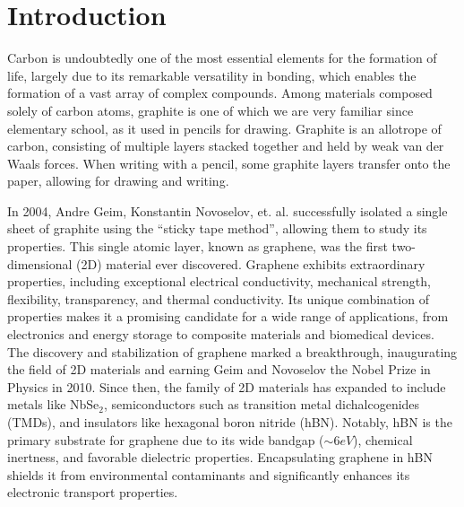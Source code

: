 %
%


\chapter{Introduction} \label{ch:intro}

Carbon is undoubtedly one of the most essential elements for the formation of life, largely due to its remarkable versatility in bonding, which enables the formation of a vast array of complex compounds. Among materials composed solely of carbon atoms, graphite is one of which we are very familiar since elementary school, as it used in pencils for drawing. Graphite is an allotrope of carbon, consisting of multiple layers stacked together and held by weak van der Waals forces. When writing with a pencil, some graphite layers transfer onto the paper, allowing for drawing and writing.

In 2004, Andre Geim, Konstantin Novoselov, et. al. \cite{novoselov_2004} successfully isolated a single sheet of graphite using the ``sticky tape method'', allowing them to study its properties. This single atomic layer, known as graphene, was the first two-dimensional (2D) material ever discovered. Graphene exhibits extraordinary properties, including exceptional electrical conductivity, mechanical strength, flexibility, transparency, and thermal conductivity. Its unique combination of properties makes it a promising candidate for a wide range of applications, from electronics and energy storage to composite materials and biomedical devices. The discovery and stabilization of graphene marked a breakthrough, inaugurating the field of 2D materials and earning Geim and Novoselov the Nobel Prize in Physics in 2010. Since then, the family of 2D materials has expanded to include metals like NbSe\(_2\), semiconductors such as transition metal dichalcogenides (TMDs), and insulators like hexagonal boron nitride (hBN). Notably, hBN is the primary substrate for graphene due to its wide bandgap ($\sim 6 \unit{eV}$), chemical inertness, and favorable dielectric properties. Encapsulating graphene in hBN shields it from environmental contaminants and significantly enhances its electronic transport properties.

